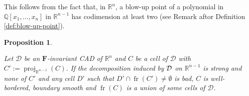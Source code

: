 \documentclass[
]{book}
\newtheorem{proposition}{Proposition}[chapter]
\theoremstyle{definition}
\theoremstyle{definition}
\theoremstyle{definition}
\theoremstyle{definition}
\theoremstyle{remark}
\begin{document}
This follows from the fact that, in \(\mathbb{R}^n\), a blow-up point of a polynomial in \(\mathbb{Q}[x_1,\ldots,x_n]\) in \(\mathbb{R}^{n-1}\) has codimension at least two (see Remark aftor Definition \ref{def:blow-up-point}).

\begin{proposition}
\protect\hypertarget{prp:no-blow-up}{}\label{prp:no-blow-up}\citep[Theorem 4.4]{lazard10}

Let \(\mathcal{D}\) be an \(\mathbf{F}\)-invariant CAD of \(\mathbb{R}^n\) and \(C\) be a cell of \(\mathcal{D}\) with \(C' := \operatorname{proj}_{\mathbb{R}^{n-1}}(C)\). If the decomposition induced by \(\cal D\) on \(\mathbb{R}^{n-1}\) is strong and none of \(C'\) and any cell \(D'\) such that \(D' \cap {\operatorname{fr} \left( C' \right)} \ne \emptyset\) is bad, \(C\) is well-bordered, boundary smooth and \({\operatorname{fr} \left( C \right)}\) is a union of some cells of \(\mathcal{D}\).
\end{proposition}
\end{document}
